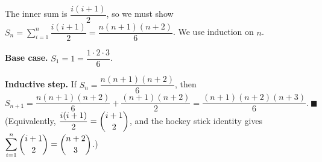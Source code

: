 The inner sum is $\dfrac{i(i+1)}{2}$, so we must show $S_n=\displaystyle\sum_{i=1}^n\dfrac{i(i+1)}{2}=\dfrac{n(n+1)(n+2)}{6}$. We use induction on $n$.

\textbf{Base case.} $S_1=1=\dfrac{1\cdot2\cdot3}{6}$.

\textbf{Inductive step.} If $S_n=\dfrac{n(n+1)(n+2)}{6}$, then
\[S_{n+1}=\dfrac{n(n+1)(n+2)}{6}+\dfrac{(n+1)(n+2)}{2}=\dfrac{(n+1)(n+2)(n+3)}{6}.\ \blacksquare\]
(Equivalently, $\dfrac{i(i+1)}{2}=\dbinom{i+1}{2}$, and the hockey stick identity gives $\displaystyle\sum_{i=1}^n\dbinom{i+1}{2}=\dbinom{n+2}{3}$.)
